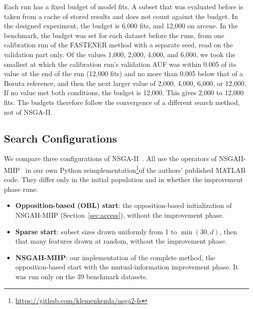 Each run has a fixed budget of model fits. A subset that was evaluated before is taken from a cache of stored results and does not count against the budget. In the designed experiment, the budget is 6{,}000 fits, and 12{,}000 on arcene. In the benchmark, the budget was set for each dataset before the runs, from one calibration run of the FASTENER method with a separate seed, read on the validation part only. Of the values 1{,}000, 2{,}000, 4{,}000, and 6{,}000, we took the smallest at which the calibration run's validation AUF was within 0.005 of its value at the end of the run (12{,}000 fits) and no more than 0.005 below that of a Boruta reference, and then the next larger value of 2{,}000, 4{,}000, 6{,}000, or 12{,}000. If no value met both conditions, the budget is 12{,}000. This gives 2{,}000 to 12{,}000 fits. The budgets therefore follow the convergence of a different search method, not of NSGA-II.

\subsection{Search Configurations}
\label{sec:configurations}

We compare three configurations of NSGA-II~\cite{Deb2002NSGAII}. All use the operators of NSGAII-MIIP~\cite{Li2025} in our own Python reimplementation\ifanonymous\else\footnote{\url{https://github.com/klemenkenda/nsga2-fs}}\fi of the authors' published MATLAB code. They differ only in the initial population and in whether the improvement phase runs:
\begin{itemize}
  \item \textbf{Opposition-based (OBL) start}: the opposition-based initialization of NSGAII-MIIP (Section~\ref{sec:access}), without the improvement phase.
  \item \textbf{Sparse start}: subset sizes drawn uniformly from 1 to $\min(30, d)$, then that many features drawn at random, without the improvement phase.
  \item \textbf{NSGAII-MIIP}: our implementation of the complete method, the opposition-based start with the mutual-information improvement phase. It was run only on the 39 benchmark datasets.
\end{itemize}

